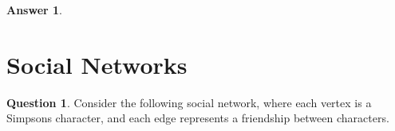 \documentclass[article, 12pt]{article}
\theoremstyle{definition}
\newtheorem{question}{Question}
\newtheorem{answer}{Answer}
\begin{document}
\begin{answer}
\begin{figure}[H]
\begin{minipage}[b]{0.4\linewidth}
            \end{minipage}
        \end{figure}
    \end{answer}
    \section{Social Networks}
    \begin{question}
        Consider the following social network, where each vertex is a Simpsons character, and each edge represents a friendship between characters.
    \end{question}
\end{document}

